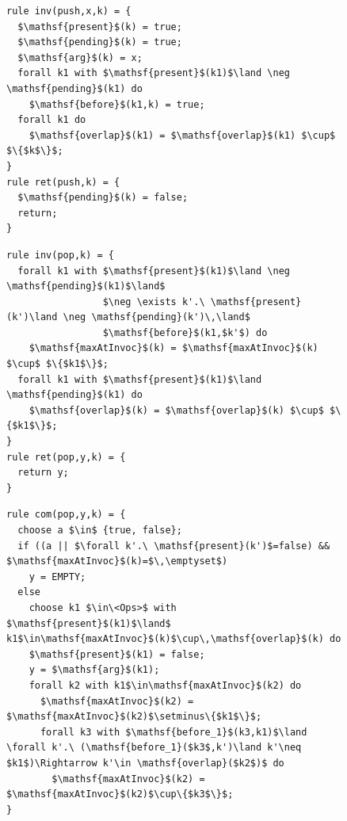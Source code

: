 \begin{figure} [t]
\vspace{-5mm}
\begin{minipage}[t]{6.2cm}
\begin{lstlisting}
rule inv(push,x,k) = {
  $\mathsf{present}$(k) = true;
  $\mathsf{pending}$(k) = true;
  $\mathsf{arg}$(k) = x;
  forall k1 with $\mathsf{present}$(k1)$\land \neg \mathsf{pending}$(k1) do
    $\mathsf{before}$(k1,k) = true;
  forall k1 do
    $\mathsf{overlap}$(k1) = $\mathsf{overlap}$(k1) $\cup$ $\{$k$\}$;
}
rule ret(push,k) = {
  $\mathsf{pending}$(k) = false;
  return;
}
\end{lstlisting}
\end{minipage}
\begin{minipage}[t]{5cm}
\begin{lstlisting}
rule inv(pop,k) = {
  forall k1 with $\mathsf{present}$(k1)$\land \neg \mathsf{pending}$(k1)$\land$
                 $\neg \exists k'.\ \mathsf{present}(k')\land \neg \mathsf{pending}(k')\,\land$ 
                 $\mathsf{before}$(k1,$k'$) do
    $\mathsf{maxAtInvoc}$(k) = $\mathsf{maxAtInvoc}$(k) $\cup$ $\{$k1$\}$;
  forall k1 with $\mathsf{present}$(k1)$\land \mathsf{pending}$(k1) do
    $\mathsf{overlap}$(k) = $\mathsf{overlap}$(k) $\cup$ $\{$k1$\}$;
}
rule ret(pop,y,k) = {
  return y;
}
\end{lstlisting}
\end{minipage}

\vspace{-4mm}
\begin{lstlisting}
rule com(pop,y,k) = {
  choose a $\in$ {true, false};
  if ((a || $\forall k'.\ \mathsf{present}(k')$=false) && $\mathsf{maxAtInvoc}$(k)=$\,\emptyset$) 
    y = EMPTY;
  else 
    choose k1 $\in\<Ops>$ with $\mathsf{present}$(k1)$\land$ k1$\in\mathsf{maxAtInvoc}$(k)$\cup\,\mathsf{overlap}$(k) do
    $\mathsf{present}$(k1) = false;
    y = $\mathsf{arg}$(k1);
    forall k2 with k1$\in\mathsf{maxAtInvoc}$(k2) do
      $\mathsf{maxAtInvoc}$(k2) = $\mathsf{maxAtInvoc}$(k2)$\setminus\{$k1$\}$;
      forall k3 with $\mathsf{before_1}$(k3,k1)$\land \forall k'.\ (\mathsf{before_1}($k3$,k')\land k'\neq $k1$)\Rightarrow k'\in \mathsf{overlap}($k2$)$ do
        $\mathsf{maxAtInvoc}$(k2) = $\mathsf{maxAtInvoc}$(k2)$\cup\{$k3$\}$;
}
\end{lstlisting}


\end{figure}
